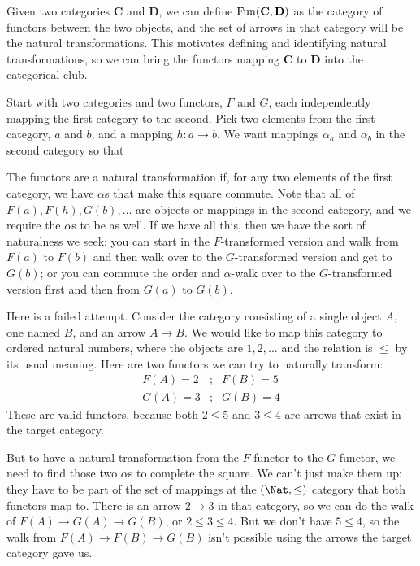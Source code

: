 \documentclass[11pt]{article}
\begin{document}
Given two categories {\bf C} and {\bf D}, we can define ${\rm Fun}({\bf C}, {\bf D})$ as
the category of functors between the two objects, and the set of arrows in that category
will be the natural transformations. This motivates defining and identifying natural
transformations, so we can bring the functors mapping {\bf C} to {\bf D} into the
categorical club.

Start with two categories and two functors, $F$ and $G$, each independently mapping the first
category to the second.  Pick two elements from the first category, $a$ and $b$, and a mapping
$h:a\to b$.  We want mappings $\alpha_a$ and $\alpha_b$ in the second category so that


The functors are a natural transformation if, for any two elements of the first category,
we have $\alpha$s that make this square commute. Note that all of $F(a), F(h), G(b),
\dots$ are objects or mappings in the second category, and we require the $\alpha$s to
be as well. If we have all this, then we have the sort of naturalness we seek: you can
start in the $F$-transformed version and walk from $F(a)$ to $F(b)$ and then walk over to
the $G$-transformed version and get to $G(b)$; or you can commute the order and
$\alpha$-walk over to the $G$-transformed version first and then from $G(a)$ to $G(b)$.

Here is a failed attempt.
Consider the category consisting of a single object $A$, one named $B$, and an arrow $A\to
B$. We would like to map this category to ordered natural numbers, where the objects are
$1,2,\dots$ and the relation is $\leq$ by its usual meaning. Here are two functors we can
try to naturally transform:
\begin{eqnarray*}
    F(A) = 2 &;& F(B) = 5\\
    G(A) = 3 &;& G(B) = 4
\end{eqnarray*} 
These are valid functors, because both $2 \leq 5$ and $3 \leq 4$ are arrows that exist in
the target category.

But to have a natural transformation from the $F$ functor to the $G$ functor, we need
to find those two $\alpha$s to complete the square. We can't just make them up:
they have to be part of the set of mappings at the $(\Nat, \leq)$ category that both
functors map to. There is an arrow $2\to 3$ in that category, so we can do the walk
of $F(A) \to G(A) \to G(B)$, or $2 \leq 3 \leq 4$.  But we don't have $5\leq 4$,
so the walk from $F(A)\to F(B) \to G(B)$ isn't possible using the arrows the target
category gave us.
\end{document}
